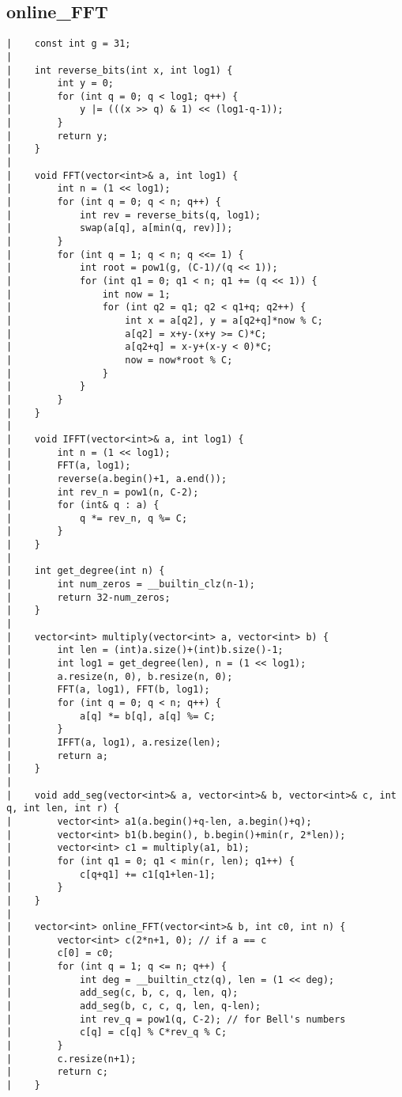 \documentclass[a4paper, 10pt]{article}
\begin{document}
\begin{center}
\section*{online\_FFT}
\begin{verbatim}
|    const int g = 31;
|    
|    int reverse_bits(int x, int log1) {
|        int y = 0;
|        for (int q = 0; q < log1; q++) {
|            y |= (((x >> q) & 1) << (log1-q-1));
|        }
|        return y;
|    }
|    
|    void FFT(vector<int>& a, int log1) {
|        int n = (1 << log1);
|        for (int q = 0; q < n; q++) {
|            int rev = reverse_bits(q, log1);
|            swap(a[q], a[min(q, rev)]);
|        }
|        for (int q = 1; q < n; q <<= 1) {
|            int root = pow1(g, (C-1)/(q << 1));
|            for (int q1 = 0; q1 < n; q1 += (q << 1)) {
|                int now = 1;
|                for (int q2 = q1; q2 < q1+q; q2++) {
|                    int x = a[q2], y = a[q2+q]*now % C;
|                    a[q2] = x+y-(x+y >= C)*C;
|                    a[q2+q] = x-y+(x-y < 0)*C;
|                    now = now*root % C;
|                }
|            }
|        }
|    }
|    
|    void IFFT(vector<int>& a, int log1) {
|        int n = (1 << log1);
|        FFT(a, log1);
|        reverse(a.begin()+1, a.end());
|        int rev_n = pow1(n, C-2);
|        for (int& q : a) {
|            q *= rev_n, q %= C;
|        }
|    }
|    
|    int get_degree(int n) {
|        int num_zeros = __builtin_clz(n-1);
|        return 32-num_zeros;
|    }
|    
|    vector<int> multiply(vector<int> a, vector<int> b) {
|        int len = (int)a.size()+(int)b.size()-1;
|        int log1 = get_degree(len), n = (1 << log1);
|        a.resize(n, 0), b.resize(n, 0);
|        FFT(a, log1), FFT(b, log1);
|        for (int q = 0; q < n; q++) {
|            a[q] *= b[q], a[q] %= C;
|        }
|        IFFT(a, log1), a.resize(len);
|        return a;
|    }
|    
|    void add_seg(vector<int>& a, vector<int>& b, vector<int>& c, int q, int len, int r) {
|        vector<int> a1(a.begin()+q-len, a.begin()+q);
|        vector<int> b1(b.begin(), b.begin()+min(r, 2*len));
|        vector<int> c1 = multiply(a1, b1);
|        for (int q1 = 0; q1 < min(r, len); q1++) {
|            c[q+q1] += c1[q1+len-1];
|        }
|    }
|    
|    vector<int> online_FFT(vector<int>& b, int c0, int n) {
|        vector<int> c(2*n+1, 0); // if a == c
|        c[0] = c0;
|        for (int q = 1; q <= n; q++) {
|            int deg = __builtin_ctz(q), len = (1 << deg);
|            add_seg(c, b, c, q, len, q);
|            add_seg(b, c, c, q, len, q-len);
|            int rev_q = pow1(q, C-2); // for Bell's numbers
|            c[q] = c[q] % C*rev_q % C;
|        }
|        c.resize(n+1);
|        return c;
|    }
\end{verbatim}


\end{center}
\end{document}
